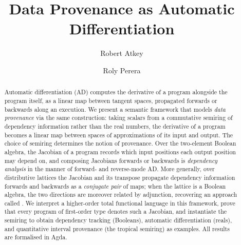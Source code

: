 \documentclass[acmsmall,screen,review,anonymous]{acmart}
\begin{document}
\title{Data Provenance as Automatic Differentiation}

\author{Robert Atkey}

\author{Roly Perera}

\begin{abstract}
  Automatic differentiation (AD) computes the derivative of a program alongside the program itself,
  as a linear map between tangent spaces, propagated forwards or backwards along an execution. We present a
  semantic framework that models \emph{data provenance} via the same construction: taking scalars from a
  commutative semiring of dependency information rather than the real numbers, the derivative of a program
  becomes a linear map between spaces of approximations of its input and output. The choice of semiring
  determines the notion of provenance. Over the two-element Boolean algebra, the Jacobian of a program
  records which input positions each output position may depend on, and composing Jacobians forwards or
  backwards is \emph{dependency analysis} in the manner of forward- and reverse-mode AD. More generally, over
  distributive lattices the Jacobian and its transpose propagate dependency information forwards and
  backwards as a \emph{conjugate pair} of maps; when the lattice is a Boolean algebra, the two directions are
  moreover related by adjunction, recovering an approach called \emph{\GPS}. We interpret a higher-order total
  functional language in this framework, prove that every program of first-order type denotes such a Jacobian,
  and instantiate the semiring to obtain dependency tracking (Booleans), automatic differentiation (reals),
  and quantitative interval provenance (the tropical semiring) as examples. All results are formalised in
  Agda.
\end{abstract}
\maketitle













% 
\end{document}

